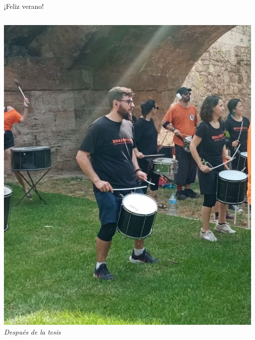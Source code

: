 \documentclass[bigger]{beamer}
\begin{document}
\begin{frame}{¡Feliz verano!}
\begin{columns}[T]
				\begin{column}[T]{6cm}
					\centering
					\includegraphics[scale=0.22]{img/tambor.jpg}
					\small
					\textit{Después de la tesis}
				\end{column}
			\end{columns}
	\end{frame}
\end{document}
